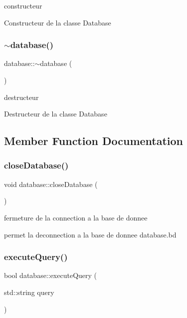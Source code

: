 constructeur 

Constructeur de la classe Database \mbox{\label{classdatabase_a31008de680565a626cd975c25d4351db}} 
\subsubsection{\texorpdfstring{$\sim$database()}{~database()}}
{\footnotesize\ttfamily database\+::$\sim$database (\begin{DoxyParamCaption}{ }\end{DoxyParamCaption})\hspace{0.3cm}{\ttfamily [virtual]}}



destructeur 

Destructeur de la classe Database 

\subsection{Member Function Documentation}
\mbox{\label{classdatabase_a9c47659b372a4f36bf68413499d4ea95}} 
\subsubsection{\texorpdfstring{close\+Database()}{closeDatabase()}}
{\footnotesize\ttfamily void database\+::close\+Database (\begin{DoxyParamCaption}{ }\end{DoxyParamCaption})}



fermeture de la connection a la base de donnee 

permet la deconnection a la base de donnee database.\+bd \mbox{\label{classdatabase_a2ca3b61b5dbb7f02220fd5bc277dcb8a}} 
\subsubsection{\texorpdfstring{execute\+Query()}{executeQuery()}}
{\footnotesize\ttfamily bool database\+::execute\+Query (\begin{DoxyParamCaption}\item[{std\+::string}]{query }\end{DoxyParamCaption})}



